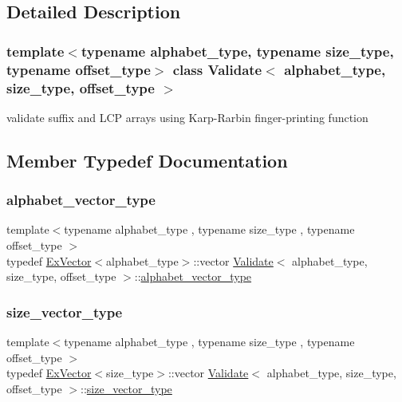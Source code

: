 \subsection{Detailed Description}
\subsubsection*{template$<$typename alphabet\+\_\+type, typename size\+\_\+type, typename offset\+\_\+type$>$\newline
class Validate$<$ alphabet\+\_\+type, size\+\_\+type, offset\+\_\+type $>$}

validate suffix and L\+CP arrays using Karp-\/\+Rarbin finger-\/printing function 

\subsection{Member Typedef Documentation}
\mbox{\label{class_validate_a0323dd6f1096806748299dfd4f644b69}} 
\subsubsection{\texorpdfstring{alphabet\+\_\+vector\+\_\+type}{alphabet\_vector\_type}}
{\footnotesize\ttfamily template$<$typename alphabet\+\_\+type , typename size\+\_\+type , typename offset\+\_\+type $>$ \\
typedef \hyperlink{struct_ex_vector}{Ex\+Vector}$<$alphabet\+\_\+type$>$\+::vector \hyperlink{class_validate}{Validate}$<$ alphabet\+\_\+type, size\+\_\+type, offset\+\_\+type $>$\+::\hyperlink{class_validate_a0323dd6f1096806748299dfd4f644b69}{alphabet\+\_\+vector\+\_\+type}\hspace{0.3cm}{\ttfamily [private]}}

\mbox{\label{class_validate_a3725fcfd4a55e4d8edc8b5d5955c081d}} 
\subsubsection{\texorpdfstring{size\+\_\+vector\+\_\+type}{size\_vector\_type}}
{\footnotesize\ttfamily template$<$typename alphabet\+\_\+type , typename size\+\_\+type , typename offset\+\_\+type $>$ \\
typedef \hyperlink{struct_ex_vector}{Ex\+Vector}$<$size\+\_\+type$>$\+::vector \hyperlink{class_validate}{Validate}$<$ alphabet\+\_\+type, size\+\_\+type, offset\+\_\+type $>$\+::\hyperlink{class_validate_a3725fcfd4a55e4d8edc8b5d5955c081d}{size\+\_\+vector\+\_\+type}\hspace{0.3cm}{\ttfamily [private]}}



